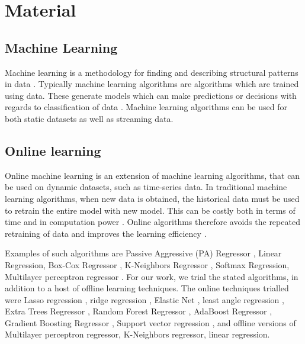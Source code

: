 \documentclass[final,3p,times,twocolumn,numbers]{elsarticle}
\begin{document}
\section{Material}
\label{sec:material}

\subsection{Machine Learning}

Machine learning is a methodology for finding and describing structural patterns in data \cite{Witten2011}. Typically machine learning algorithms are algorithms which are trained using data. These generate models which can make predictions or decisions with regards to classification of data \cite{Johansson2017}. Machine learning algorithms can be used for both static datasets as well as streaming data.




\subsection{Online learning}

Online machine learning is an extension of machine learning algorithms, that can be used on dynamic datasets, such as time-series data. In traditional machine learning algorithms, when new data is obtained, the historical data must be used to retrain the entire model with new model. This can be costly both in terms of time and in computation power \cite{Li2016}. Online algorithms therefore  avoids the repeated retraining of data and improves the learning efficiency \cite{Rong2009}.

Examples of such algorithms are Passive Aggressive (PA) Regressor \cite{Gzik2014}, Linear Regression, Box-Cox Regressor \cite{Box1964}, K-Neighbors Regressor \cite{forgy65}, Softmax Regression, Multilayer perceptron regressor \cite{Hinton1989}. For our work, we trial the stated algorithms, in addition to a host of offline learning techniques. The online techniques trialled were Lasso regression \cite{Tibshirani1996a}, ridge regression \cite{GeladiPaul1994Mrac},  Elastic Net \cite{Geostatistics2010}, least angle regression \cite{Fike1988}, Extra Trees Regressor \cite{Fike1988}, Random Forest Regressor \cite{Breiman2001}, AdaBoost Regressor \cite{Freund1997}, Gradient Boosting Regressor \cite{316}, Support vector regression \cite{Cortes1995}, and offline versions of Multilayer perceptron regressor, K-Neighbors regressor, linear regression.
\end{document}
